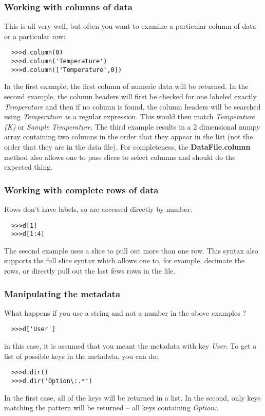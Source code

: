 \documentclass[a4paper,11pt]{scrartcl}
\begin{document}
\subsubsection{Working with columns of data}

This is all very well, but often you want to examine a particular column of data or a particular row:
\begin{verbatim}
  >>>d.column(0)
  >>>d.column('Temperature')
  >>>d.column(['Temperature',0])
\end{verbatim}
In the first example, the first column of numeric data will be returned. In the second example, the column headers will first be checked for one labeled exactly \textit{Temperature} and then if no column is found, the column headers will be searched using \textit{Temperature} as a regular expression. This would then match \textit{Temperature (K)} or \textit{Sample Temperature}.  The third example results in a 2 dimensional numpy array containing two columns in the order that they appear in the list (\ie not the order that they are in the data file). For completeness, the \textbf{DataFile.column} method also allows one to pass slices to select columns and should do the expected thing.

\subsubsection{Working with complete rows of data}

Rows don't have labels, so are accessed directly by number:
\begin{verbatim}
  >>>d[1]
  >>>d[1:4]
\end{verbatim}
The second example uses a slice to pull out more than one row. This syntax also supports the full slice syntax which allows one to, for example, decimate the rows, or directly pull out the last fews rows in the file.

\subsubsection{Manipulating the metadata}

What happens if you use a string and not a number in the above examples ?
\begin{verbatim}
  >>>d['User']
\end{verbatim}
in this case, it is assumed that you meant the metadata with key \textit{User}. To get a list of possible keys in the metadata, you can do:
\begin{verbatim}
  >>>d.dir()
  >>>d.dir('Option\:.*')
\end{verbatim}
In the first case, all of the keys will be returned in a list. In the second, only keys matching the pattern will be returned -- all keys containing \textit{Option:}.
\end{document}
